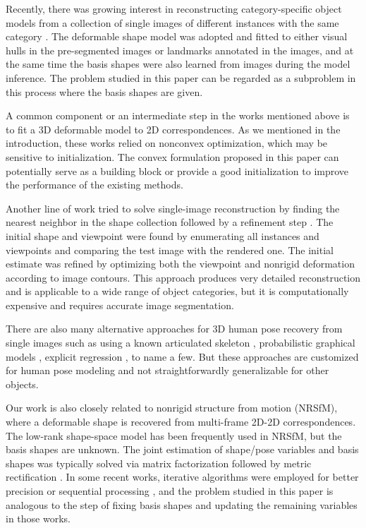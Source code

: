 \documentclass[10pt,journal,cspaper,compsoc]{IEEEtran}
\begin{document}
Recently, there was growing interest in reconstructing category-specific object models from a collection of single images of different instances with the same category \cite{cashman2013shape,vicente2014reconstructing,carreira2015virtual,kar2015category}. The deformable shape model was adopted and fitted to either visual hulls in the pre-segmented images or landmarks annotated in the images, and at the same time the basis shapes were also learned from images during the model inference. The problem studied in this paper can be regarded as a subproblem in this process where the basis shapes are given.

A common component or an intermediate step in the works mentioned above is to fit a 3D deformable model to 2D correspondences. As we mentioned in the introduction, these works relied on nonconvex optimization, which may be sensitive to initialization. The convex formulation proposed in this paper can potentially serve as a building block or provide a good initialization to improve the performance of the existing methods.

Another line of work tried to solve single-image reconstruction by finding the nearest neighbor in the shape collection followed by a refinement step \cite{su2014estimating,huang2015single}. The initial shape and viewpoint were found by enumerating all instances and viewpoints and comparing the test image with the rendered one. The initial estimate was refined by optimizing both the viewpoint and nonrigid deformation according to image contours. This approach produces very detailed reconstruction and is applicable to a wide range of object categories, but it is computationally expensive and requires accurate image segmentation.

There are also many alternative approaches for 3D human pose recovery from single images such as using a known articulated skeleton \cite{taylor2000reconstruction,guan2009estimating,leonardos2016articulated}, probabilistic graphical models \cite{sigal2006predicting,andriluka2010monocular}, explicit regression \cite{elgammal2004inferring,agarwal2006recovering}, to name a few. But these approaches are customized for human pose modeling and not straightforwardly generalizable for other objects.

Our work is also closely related to nonrigid structure from motion (NRSfM), where a deformable shape is recovered from multi-frame 2D-2D correspondences. The low-rank shape-space model has been frequently used in NRSfM, but the basis shapes are unknown. The joint estimation of shape/pose variables and basis shapes was typically solved via matrix factorization followed by metric rectification \cite{bregler2000recovering,xiao2006closed}. In some recent works, iterative algorithms were employed for better precision \cite{paladini2012optimal,del2012bilinear} or sequential processing \cite{agudo2014good}, and the problem studied in this paper is analogous to the step of fixing basis shapes and updating the remaining variables in those works.
\end{document}
